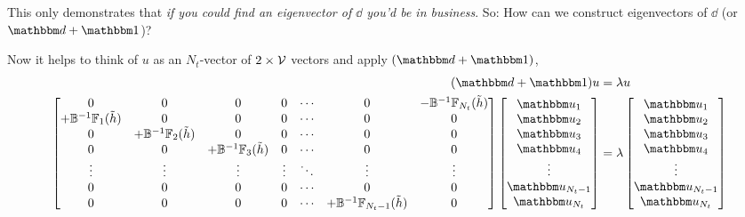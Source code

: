 This only demonstrates that \emph{if you could find an eigenvector of $\dd$ you'd be in business}.
So: How can we construct eigenvectors of $\dd$ (or $\dd+\one$)?

Now it helps to think of $u$ as an $N_t$-vector of $2\times\mathcal{V}$ vectors and apply $(\dd+\one)$,
\begin{align}
    (\dd+\one) u &= \lambda u
    \nonumber\\
	\begin{bmatrix}
			0                               & 0                                 & 0                                 & 0         & \cdots & 0                                    & -\BB\inverse\FF_{N_t}(\tilde{h})
		\\	+\BB\inverse\FF_{1}(\tilde{h})  & 0                                 & 0                                 & 0         & \cdots & 0                                    & 0
		\\	0                               & +\BB\inverse\FF_{2}(\tilde{h})    & 0                                 & 0         & \cdots & 0                                    & 0
		\\	0                               & 0                                 & +\BB\inverse\FF_{3}(\tilde{h})    & 0         & \cdots & 0                                    & 0
		\\	\vdots                          & \vdots                            & \vdots                            & \vdots    & \ddots & \vdots                               & \vdots
		\\	0                               & 0                                 & 0                                 & 0         & \cdots & 0                                    & 0
		\\	0                               & 0                                 & 0                                 & 0         & \cdots & +\BB\inverse\FF_{N_t-1}(\tilde{h})   & 0
	\end{bmatrix}
    \begin{bmatrix}
            \uu_1
        \\  \uu_2
        \\  \uu_3
        \\  \uu_4
        \\  \vdots
        \\  \uu_{N_t-1}
        \\  \uu_{N_t}
    \end{bmatrix}
    &=
    \lambda
    \begin{bmatrix}
            \uu_1
        \\  \uu_2
        \\  \uu_3
        \\  \uu_4
        \\  \vdots
        \\  \uu_{N_t-1}
        \\  \uu_{N_t}
    \end{bmatrix}
\end{align}
